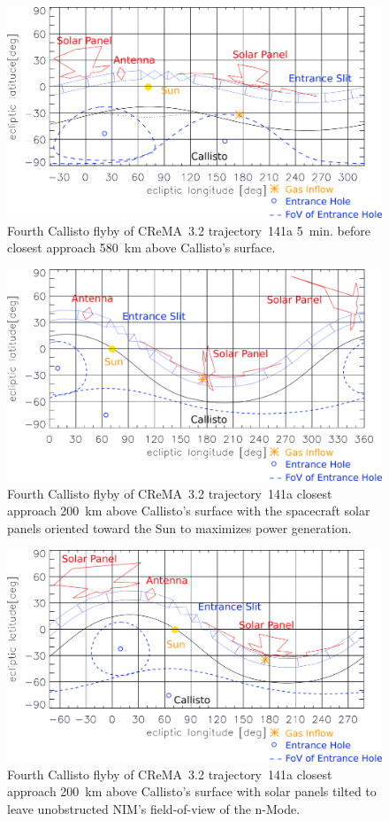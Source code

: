 	\begin{figure}[h!]
		\centering
		\includegraphics[width = .7\textwidth]{Bilder/NIM_pointing_2031JAN15194700.png}
		\caption{Fourth Callisto flyby of CReMA~3.2 trajectory~141a \cite{SOC_Crema3p2} 5~min. before closest approach 580~km above Callisto's surface.}
		\label{fig:FlybyCal1947}
	\end{figure}
	\begin{figure}[h!]
		\centering
		\includegraphics[width = .7\textwidth]{Bilder/NIM_pointing_2031JAN15195200_tilt.png}
		\caption{Fourth Callisto flyby of CReMA~3.2 trajectory~141a \cite{SOC_Crema3p2} closest approach 200~km above Callisto's surface with the spacecraft solar panels oriented toward the Sun to maximizes power generation.}
		\label{fig:FlybyCal1952sol}
	\end{figure}
	\begin{figure}[h!]
		\centering
		\includegraphics[width = .7\textwidth]{Bilder/NIM_pointing_2031JAN15195200.png}
		\caption{Fourth Callisto flyby of CReMA~3.2 trajectory~141a \cite{SOC_Crema3p2} closest approach 200~km above Callisto's surface with solar panels tilted to leave unobstructed NIM's field-of-view of the n-Mode.}
		\label{fig:FlybyCal1952}
	\end{figure}

